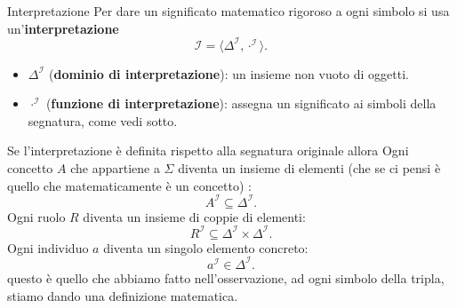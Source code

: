 \begin{definition}{Interpretazione}
    Per dare un significato matematico rigoroso a ogni simbolo si usa
    un'\textbf{interpretazione}
    \[
        \mathcal I=\langle\Delta^{\mathcal I},\cdot^{\mathcal I}\rangle.
    \]
    \begin{itemize}
        \item \(\Delta^{\mathcal I}\) (\textbf{dominio di interpretazione}):
            un insieme non vuoto di oggetti.
        \item \(\cdot^{\mathcal I}\) (\textbf{funzione di interpretazione}):
            assegna un significato ai simboli della segnatura, come vedi sotto.
    \end{itemize}
    Se l'interpretazione è definita rispetto alla segnatura originale allora
    Ogni concetto \(A\) che appartiene a $\Sigma$ diventa un insieme di elementi (che se ci pensi è quello che matematicamente è un concetto) :
    \[
        A^{\mathcal I}\subseteq\Delta^{\mathcal I}.
    \]
    Ogni ruolo \(R\) diventa un insieme di coppie di elementi:
    \[
        R^{\mathcal I}\subseteq\Delta^{\mathcal I}\times\Delta^{\mathcal I}.
    \]
    Ogni individuo \(a\) diventa un singolo elemento concreto:
    \[
        a^{\mathcal I}\in\Delta^{\mathcal I}.
    \]
    questo è quello che abbiamo fatto nell'osservazione, ad ogni simbolo della tripla, stiamo dando una definizione matematica.
\end{definition}


